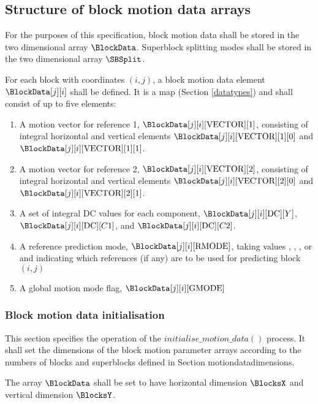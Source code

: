\subsection{Structure of block motion data arrays}

\label{motionconventions}

For the purposes of this specification, block motion data shall be stored in the 
two dimensional array $\BlockData$. Superblock
splitting modes shall be stored in the two dimensional array $\SBSplit$.

For each block with coordinates $(i,j)$, a block motion data element 
$\BlockData[j][i]$ shall be defined. It is a map (Section \ref{datatypes}) and shall
consist of up to five elements:

\begin{enumerate}
\item A motion vector for reference 1, $\BlockData[j][i][\Vect][1]$, consisting of 
integral horizontal and vertical elements $\BlockData[j][i][\Vect][1][0]$ and 
$\BlockData[j][i][\Vect][1][1]$.
\item A motion vector for reference 2, $\BlockData[j][i][\Vect][2]$, consisting of 
integral horizontal and vertical elements $\BlockData[j][i][\Vect][2][0]$ and 
$\BlockData[j][i][\Vect][2][1]$.
\item A set of integral DC values for each component, $\BlockData[j][i][\DC][Y]$,
 $\BlockData[j][i][\DC][C1]$, and $\BlockData[j][i][\DC][C2]$.
\item A reference prediction mode, $\BlockData[j][i][\RMode]$, taking values \Intra, 
\RefOneOnly, \RefTwoOnly, or \RefOneAndTwo and indicating which references 
(if any) are to be used for predicting block $(i,j)$
\item A global motion mode flag, $\BlockData[j][i][\GMode]$
\end{enumerate}

\subsubsection{Block motion data initialisation}

\label{motioninit}

This section specifies the operation of the $initialise\_motion\_data()$ process.
 It shall set the dimensions of the block motion parameter arrays according to the numbers
of blocks and superblocks defined in Section {motiondatadimensions}.

The array $\BlockData$ shall be set to have horizontal dimension $\BlocksX$ and 
vertical dimension $\BlocksY$.

